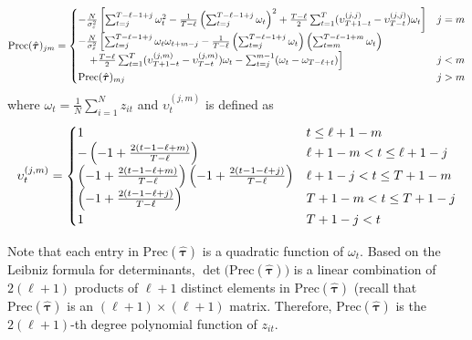 	\begin{equation}\label{eqn:d-optimal-precision}
	    \begin{aligned}
	        \mathrm{Prec}(\hat{\bm{\tau}})_{jm}  = \begin{cases} 
					- \frac{N}{\sigma_\varepsilon^2} \left[ \sum_{t = j}^{T - \ell-1+j} \omega_t^2  - \frac{1}{T - \ell} \left(  \sum_{t=j}^{T - \ell-1+j} \omega_t \right)^2 + \frac{T - \ell}{2} \sum_{t = 1}^T (\upsilon_{T+1-t}^{(j,j)} - \upsilon_{T-t}^{(j,j)}) \omega_t  \right] &  j = m\\
					 - \frac{N}{\sigma_\varepsilon^2} \left[ \sum_{t=j}^{T - \ell-1+j} \omega_t \omega_{t+m-j} -  \frac{1}{T - \ell} \left(  \sum_{t=j}^{T - \ell-1+j} \omega_t \right)  \left( \sum_{t=m}^{T - \ell-1+m} \omega_t \right)  \right.  \\
					\quad \left.  + \frac{T - \ell}{2} \sum_{t = 1}^T (\upsilon_{T+1-t}^{(j,m)} - \upsilon_{T-t}^{(j,m)}) \omega_t -  \sum_{t = j}^{m-1} (\omega_t  -  \omega_{T - \ell+t}) \right]    & j < m\\
					\mathrm{Prec}(\hat{\bm{\tau}})_{mj} & j > m \\
				\end{cases}
	    \end{aligned}
	\end{equation}
	where $\omega_t = \frac{1}{N} \sum_{i = 1}^N z_{it}$ and $\upsilon_t^{(j,m)}$  is defined as
	\begin{eqnarray*}
		\upsilon_t^{(j,m)} = \begin{cases}
			1 &  t \leq \ell+1-m\\
			-\left( -1 + \frac{2(t-1-\ell+m)}{T - \ell} \right) & \ell+1-m < t \leq \ell+1-j \\
			\left(  -1 + \frac{2(t-1-\ell+m)}{T - \ell} \right) \left(  -1 + \frac{2(t-1-\ell+j)}{T - \ell} \right) & \ell+1-j < t \leq T+1-m \\
			\left(  -1 + \frac{2(t-1-\ell+j)}{T - \ell} \right) & T+1-m < t \leq T+1-j \\
			1 & T+1-j < t \\
		\end{cases}
	\end{eqnarray*}
	
		Note that each entry in $\mathrm{Prec}(\hat{\bm{\tau}})$ is a quadratic function of $\omega_t$. Based on the Leibniz formula for determinants,  $\det \big( \mathrm{Prec}(\hat{\bm{\tau}}) \big)$ is a linear combination of $2(\ell+1)$ products of $\ell+1$ distinct elements in $\mathrm{Prec}(\hat{\bm{\tau}})$ (recall that $\mathrm{Prec}(\hat{\bm{\tau}})$ is an $(\ell+1) \times (\ell +1)$ matrix. Therefore, $\mathrm{Prec}(\hat{\bm{\tau}})$ is the $2(\ell+1)$-th degree polynomial function of $z_{it}$. 
		
